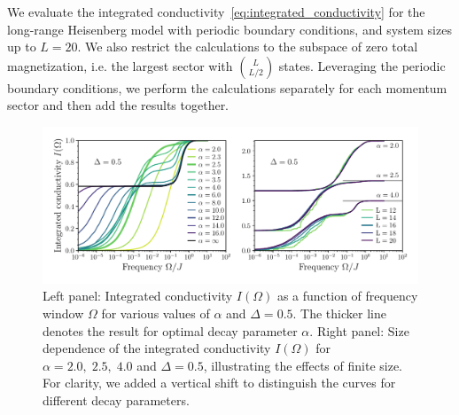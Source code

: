 We evaluate the integrated conductivity~\eqref{eq:integrated_conductivity} for the long-range Heisenberg model
with periodic boundary conditions, and system sizes up to \(L=20\). We also restrict the calculations to the
subspace of zero total magnetization, i.e. the largest sector with \(\binom{L}{L/2}\) states. Leveraging
the periodic boundary conditions, we perform the calculations separately for each momentum sector and then
add the results together.

\begin{figure}[htbp]
  \centering
  \includegraphics[width=\linewidth]{Figures/optical_conductivity.pdf}
  \caption{Left panel: Integrated conductivity \(I(\Omega)\) as a function of frequency window \(\Omega\) for various values of \(\alpha\)
  and \(\Delta = 0.5\). The thicker line denotes the result for optimal decay parameter \(\alpha\). Right panel: Size dependence
  of the integrated conductivity \(I(\Omega)\) for \(\alpha = 2.0, \; 2.5,\; 4.0\) and \(\Delta = 0.5\),
  illustrating the effects of finite size. For clarity, we added a vertical shift to distinguish the curves for different
  decay parameters.}
  \label{fig:optical_conductivity}
\end{figure}

